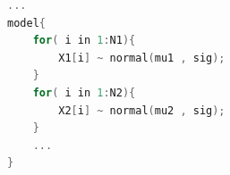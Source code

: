 \begin{lstlisting}[language=C++,label={stan::19_02},caption={丁寧な尤度の記載}]
    ...
model{
    for( i in 1:N1){
        X1[i] ~ normal(mu1 , sig);
    }
    for( i in 1:N2){
        X2[i] ~ normal(mu2 , sig);
    }
    ...
}

\end{lstlisting}
